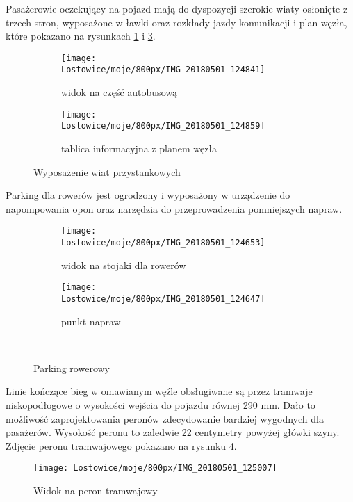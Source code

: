 \documentclass[twoside,12pt]{article}
\begin{document}
	Pasażerowie oczekujący na pojazd mają do dyspozycji szerokie wiaty osłonięte z trzech stron, wyposażone w ławki oraz rozkłady jazdy komunikacji i plan węzła, które pokazano na rysunkach \ref{lostowice5a} i \ref{lostowice5b}.
	
	\begin{figure}[H]
	\centering
	\begin{subfigure}{.48\textwidth}
	  \centering
	  \texttt{[image: Lostowice/moje/800px/IMG\_20180501\_124841]}
	  \caption{widok na część autobusową}
	  \label{lostowice5a}
	\end{subfigure}%
	\hfill%
	\begin{subfigure}{.48\textwidth}
	  \centering
	  \texttt{[image: Lostowice/moje/800px/IMG\_20180501\_124859]}
	  \caption{tablica informacyjna z planem węzła}
	  \label{lostowice5b}
	\end{subfigure}
	\caption{Wyposażenie wiat przystankowych}	
	\end{figure}
	
	Parking dla rowerów jest ogrodzony i wyposażony w urządzenie do napompowania opon oraz narzędzia do przeprowadzenia pomniejszych napraw.
	
	\begin{figure}[H]
		\centering
		\begin{subfigure}{.66\textwidth}
	  \centering
	  \texttt{[image: Lostowice/moje/800px/IMG\_20180501\_124653]}
	  \caption{widok na stojaki dla rowerów}
		\end{subfigure}%
		\hfill%
		\begin{subfigure}{.33\textwidth}
	  \centering
	  \texttt{[image: Lostowice/moje/800px/IMG\_20180501\_124647]}
	  \caption{punkt napraw}
		\end{subfigure}\\
		\caption{Parking rowerowy}		
	\end{figure}	
	
	Linie kończące bieg w omawianym węźle obsługiwane są przez tramwaje niskopodłogowe o wysokości wejścia do pojazdu równej 290 mm. Dało to możliwość zaprojektowania peronów zdecydowanie bardziej wygodnych dla pasażerów. Wysokość peronu to zaledwie 22 centymetry powyżej główki szyny. Zdjęcie peronu tramwajowego pokazano na rysunku \ref{lostowice4}.
	
		\begin{figure}[H]
		\centering
		\texttt{[image: Lostowice/moje/800px/IMG\_20180501\_125007]}\\
		\caption{Widok na peron tramwajowy}
		\label{lostowice4}
	\end{figure}
	
\end{document}
